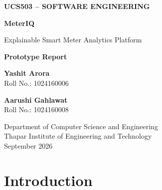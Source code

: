 \documentclass[12pt,a4paper]{report}
\begin{document}

\begin{titlepage}
\hypersetup{pageanchor=false}

\centering

\vspace*{1.5cm}

{\Large\bfseries UCS503 -- SOFTWARE ENGINEERING\par}

\vspace{1cm}

{\Huge\bfseries MeterIQ\par}

\vspace{0.3cm}

{\Large Explainable Smart Meter Analytics Platform\par}

\vspace{1.2cm}

{\large\bfseries Prototype Report\par}

\vspace{1.2cm}

{\large
\textbf{Yashit Arora}\\
Roll No.: 1024160006
\par}

\vspace{0.5cm}

{\large
\textbf{Aarushi Gahlawat}\\
Roll No.: 1024160008
\par}

\vfill

{\large
Department of Computer Science and Engineering\\
Thapar Institute of Engineering and Technology\\
September 2026
\par}

\end{titlepage}
\hypersetup{pageanchor=true}



\chapter{Introduction}
\end{document}
